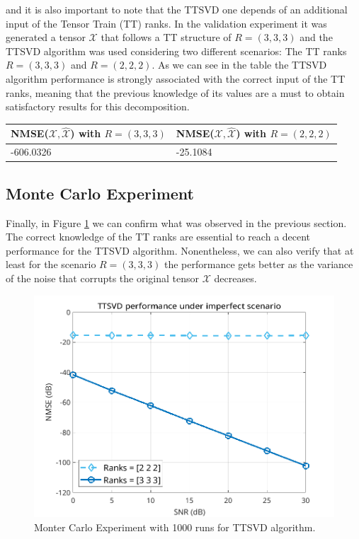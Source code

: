\documentclass[a4paper,10pt]{article}
\begin{document}
    and it is also important to note that the TTSVD one depends of an additional input of the Tensor Train (TT) ranks. 
    In the validation experiment it was generated a tensor $\mathcal{X}$ that follows a TT structure of $R = (3,3,3)$ and the TTSVD algorithm 
    was used considering two different scenarios: The TT ranks $R = (3,3,3)$ and $R = (2,2,2)$. As we can see in the table the TTSVD algorithm performance
    is strongly associated with the correct input of the TT ranks, meaning that the previous knowledge of its values are a must to obtain satisfactory results 
    for this decomposition.  

    \begin{table}[ht!]
        \centering
        \begin{tabular}{|l|l|}
        \hline
        NMSE($\mathcal{X}, \mathcal{\hat{X}}$) with $R = (3,3,3)$ & NMSE($\mathcal{X}, \mathcal{\hat{X}}$) with $R = (2,2,2)$ \\ \hline 
        -606.0326 & -25.1084 \\ \hline
        \end{tabular}
    \end{table}

    \subsection*{Monte Carlo Experiment}

    Finally, in Figure \ref{fig:hw13} we can confirm what was observed in the previous section. The correct knowledge of the TT ranks are essential to reach
    a decent performance for the TTSVD algorithm. Nonentheless, we can also verify that at least for the scenario $R = (3,3,3)$ the performance gets better as
    the variance of the noise that corrupts the original tensor $\mathcal{X}$ decreases.

    \begin{figure}[ht!]
        \centering 
        \includegraphics[width=0.65\linewidth]{figs/hw13.png} \par 
        \caption{Monter Carlo Experiment with 1000 runs for TTSVD algorithm.}
        \label{fig:hw13} 
    \end{figure}
\end{document}

